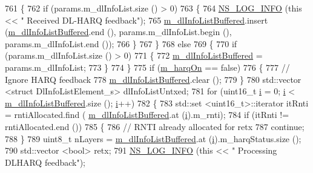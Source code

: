 \begin{DoxyCode}
761     \{
762       \textcolor{keywordflow}{if} (params.m\_dlInfoList.size () > 0)
763         \{
764           \hyperlink{group__logging_gafbd73ee2cf9f26b319f49086d8e860fb}{NS\_LOG\_INFO} (\textcolor{keyword}{this} << \textcolor{stringliteral}{" Received DL-HARQ feedback"});
765           \hyperlink{classns3_1_1TdBetFfMacScheduler_ad28a9447cadd7f80c4fe5d3801d8828b}{m\_dlInfoListBuffered}.insert (\hyperlink{classns3_1_1TdBetFfMacScheduler_ad28a9447cadd7f80c4fe5d3801d8828b}{m\_dlInfoListBuffered}.end (),
       params.m\_dlInfoList.begin (), params.m\_dlInfoList.end ());
766         \}
767     \}
768   \textcolor{keywordflow}{else}
769     \{
770       \textcolor{keywordflow}{if} (params.m\_dlInfoList.size () > 0)
771         \{
772           \hyperlink{classns3_1_1TdBetFfMacScheduler_ad28a9447cadd7f80c4fe5d3801d8828b}{m\_dlInfoListBuffered} = params.m\_dlInfoList;
773         \}
774     \}
775   \textcolor{keywordflow}{if} (\hyperlink{classns3_1_1TdBetFfMacScheduler_a8de90c082c621bf8d664fff8cf370acb}{m\_harqOn} == \textcolor{keyword}{false})
776     \{
777       \textcolor{comment}{// Ignore HARQ feedback}
778       \hyperlink{classns3_1_1TdBetFfMacScheduler_ad28a9447cadd7f80c4fe5d3801d8828b}{m\_dlInfoListBuffered}.clear ();
779     \}
780   std::vector <struct DlInfoListElement\_s> dlInfoListUntxed;
781   \textcolor{keywordflow}{for} (uint16\_t \hyperlink{bernuolliDistribution_8m_a6f6ccfcf58b31cb6412107d9d5281426}{i} = 0; \hyperlink{bernuolliDistribution_8m_a6f6ccfcf58b31cb6412107d9d5281426}{i} < \hyperlink{classns3_1_1TdBetFfMacScheduler_ad28a9447cadd7f80c4fe5d3801d8828b}{m\_dlInfoListBuffered}.size (); \hyperlink{bernuolliDistribution_8m_a6f6ccfcf58b31cb6412107d9d5281426}{i}++)
782     \{
783       std::set <uint16\_t>::iterator itRnti = rntiAllocated.find (
      \hyperlink{classns3_1_1TdBetFfMacScheduler_ad28a9447cadd7f80c4fe5d3801d8828b}{m\_dlInfoListBuffered}.at (\hyperlink{bernuolliDistribution_8m_a6f6ccfcf58b31cb6412107d9d5281426}{i}).m\_rnti);
784       \textcolor{keywordflow}{if} (itRnti != rntiAllocated.end ())
785         \{
786           \textcolor{comment}{// RNTI already allocated for retx}
787           \textcolor{keywordflow}{continue};
788         \}
789       uint8\_t nLayers = \hyperlink{classns3_1_1TdBetFfMacScheduler_ad28a9447cadd7f80c4fe5d3801d8828b}{m\_dlInfoListBuffered}.at (\hyperlink{bernuolliDistribution_8m_a6f6ccfcf58b31cb6412107d9d5281426}{i}).m\_harqStatus.size ();
790       std::vector <bool> retx;
791       \hyperlink{group__logging_gafbd73ee2cf9f26b319f49086d8e860fb}{NS\_LOG\_INFO} (\textcolor{keyword}{this} << \textcolor{stringliteral}{" Processing DLHARQ feedback"});

\end{DoxyCode}
